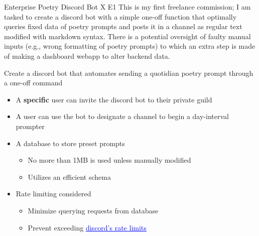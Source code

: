 \documentclass[7px]{article}
\begin{document}
\frontmatter
{Enterprise}
{Poetry Discord Bot}
{X}
{E1}
{This is my first freelance commission; I am tasked to create a discord bot with a simple one-off function that optimally queries fixed data of poetry prompts and posts it in a channel as regular text modified with markdown syntax. There is a potential oversight of faulty manual inputs (e.g., wrong formatting of poetry prompts) to which an extra step is made of making a dashboard webapp to alter backend data.}

\strategy
{
  Create a discord bot that automates sending a quotidian poetry prompt through a one-off command
}
{
  \begin{enumerate}
    \small
    \begin{itemize}[label=$\multimapdotinv$, leftmargin=1.7mm]
      \item A \textbf{specific} user can invite the discord bot to their private guild
      \item A user can use the bot to designate a channel to begin a day-interval prompter
      \item A database to store preset prompts
        \begin{itemize}
          \item No more than 1MB is used unless manually modified
          \item Utilizes an efficient schema
        \end{itemize}
      \item Rate limiting considered
        \begin{itemize}
          \item Minimize querying requests from database
        \item Prevent exceeding \href{https://www.themuse.com/advice/185-powerful-verbs-that-will-make-your-resume-awesome}{\textcolor{blue}{\underline{discord's rate limits}}}
        \end{itemize}
    \end{itemize}
    \normalsize
\end{enumerate}
}
\end{document}
